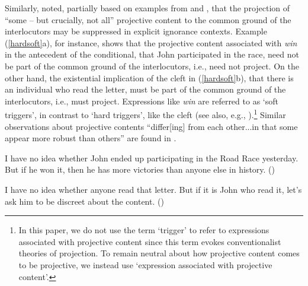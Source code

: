 \documentclass[11pt,fleqn]{article}
\newcommand{\6}{\mbox{$[\hspace*{-.6mm}[$}}
\newcommand{\9}{\mbox{$]\hspace*{-.6mm}]$}}
\def\infelic{{\leavevmode\llap{\#}}}
\begin{document}
Similarly, \citet[432]{simons01} noted, partially based on examples from \citealt{ccmg90} and \citealt{geurts94}, that the projection of ``some -- but crucially, not all'' projective content to the common ground of the interlocutors may be suppressed in explicit ignorance contexts. Example (\ref{hardsoft}a), for instance, shows that the projective content associated with {\em win} in the antecedent of the conditional, that John participated in the race, need not be part of the common ground of the interlocutors, i.e., need not project. On the other hand, the existential implication of the cleft in (\ref{hardsoft}b), that there is an individual who read the letter, must be part of the common ground of the interlocutors, i.e., must project. Expressions like {\em win} are referred to as `soft triggers', in contrast to `hard triggers', like the cleft (see also, e.g., \citealt{abusch10,abrusan2016}).\footnote{In this paper, we do not use the term `trigger' to refer to expressions associated with projective content since this term evokes conventionalist theories of projection. To remain neutral about how projective content comes to be projective, we instead use `expression associated with projective content'.} Similar observations about projective contents ``differ[ing] from each other...in that some appear more robust than others'' are found in \citealt[ch.11]{kadmon01}.

\begin{exe}
\ex\label{hardsoft}
\begin{xlist}

\ex I have no idea whether John ended up participating in the Road Race yesterday. But if he won it, then he has more victories than anyone else in history. \hfill (\citealt[39]{abusch10})

\ex\infelic I have no idea whether anyone read that letter. But if it is John
who read it, let's ask him to be discreet about the content. \hfill (\citealt[40]{abusch10})

\end{xlist}
\end{exe}
\end{document}
